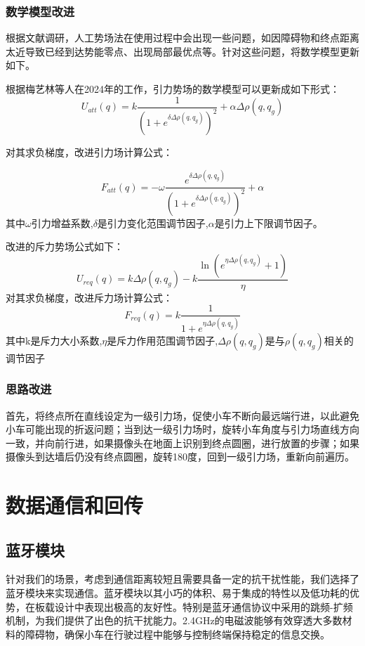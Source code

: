 \documentclass{report}
\begin{document}
\subsubsection{数学模型改进}
\label{subsec:label}
根据文献调研，人工势场法在使用过程中会出现一些问题，如因障碍物和终点距离太近导致已经到达势能零点、出现局部最优点等。针对这些问题，将数学模型更新如下。

根据梅艺林等人在2024年的工作\cite{jh7}，引力势场的数学模型可以更新成如下形式：
\[ U_{att}(q)=k\frac1{\left(1+e^{\delta\Delta\rho(q,q_g)}\right)^2}+\alpha\Delta\rho(q,q_g) \]

对其求负梯度，改进引力场计算公式：

\[ F_{att}(q)=-\omega\frac{e^{\delta\Delta\rho(q,q_g)}}{\left(1+e^{\delta\Delta\rho(q,q_g)}\right)^2}+\alpha  \]
其中$\omega$引力增益系数,$\delta$是引力变化范围调节因子,$\alpha$是引力上下限调节因子。

改进的斥力势场公式如下：
\[ U_{req}(q)=k\Delta\rho(q,q_g)-k\frac{\ln{(e^{\eta\Delta\rho(q,q_g)}+1)}}{\eta} \]
对其求负梯度，改进斥力场计算公式：
\[ F_{req}(q)=k\frac1{1+e^{\eta\Delta\rho(q,q_g)}} \]
其中k是斥力大小系数,$\eta$是斥力作用范围调节因子,$\Delta\rho(q,q_{g})$是与$\rho(q,q_{g})$相关的调节因子
\subsubsection{思路改进}
\label{subsec:label}
首先，将终点所在直线设定为一级引力场，促使小车不断向最远端行进，以此避免小车可能出现的折返问题；当到达一级引力场时，旋转小车角度与引力场直线方向一致，并向前行进，如果摄像头在地面上识别到终点圆圈，进行放置的步骤；如果摄像头到达墙后仍没有终点圆圈，旋转180度，回到一级引力场，重新向前遍历。

\section{数据通信和回传}
\label{sec:label}
\subsection{蓝牙模块}
\label{subsec:label}
针对我们的场景，考虑到通信距离较短且需要具备一定的抗干扰性能，我们选择了蓝牙模块来实现通信。蓝牙模块以其小巧的体积、易于集成的特性以及低功耗的优势，在板载设计中表现出极高的友好性。特别是蓝牙通信协议中采用的跳频-扩频机制，为我们提供了出色的抗干扰能力。2.4GHz的电磁波能够有效穿透大多数材料的障碍物，确保小车在行驶过程中能够与控制终端保持稳定的信息交换。
\end{document}
